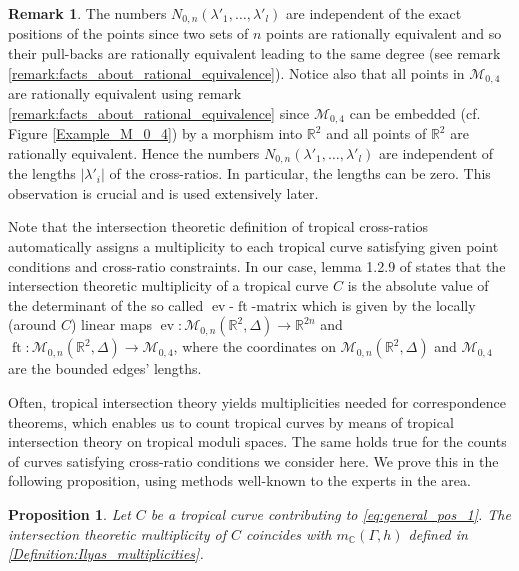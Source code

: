 \documentclass[11pt,reqno,a4]{amsart}
\theoremstyle{dotless}
\newtheorem{proposition}[corollary]{Proposition}
\theoremstyle{definition}
\newtheorem{remark}[corollary]{Remark}
\newcommand{\ft}{\operatorname{ft}}
\newcommand{\ev}{\operatorname{ev}}
\begin{document}
\begin{remark}\label{Remark:N_(0,n)independent of positions/lengths}
The numbers $N_{0,n}\left(\lambda'_1,\dots,\lambda'_l\right)$ are independent of the exact positions of the points since two sets of $n$ points are rationally equivalent and so their pull-backs are rationally equivalent leading to the same degree (see remark \ref{remark:facts_about_rational_equivalence}). Notice also that all points in $\mathcal{M}_{0,4}$ are rationally equivalent using remark \ref{remark:facts_about_rational_equivalence} since $\mathcal{M}_{0,4}$ can be embedded (cf. Figure \ref{Example_M_0_4}) by a morphism into $\mathbb{R}^2$ and all points of $\mathbb{R}^2$ are rationally equivalent. Hence the numbers $N_{0,n}\left(\lambda'_1,\dots,\lambda'_l\right)$ are independent of the lengths $|\lambda'_i|$ of the cross-ratios. In particular, the lengths can be zero. This observation is crucial and is used extensively later.
\end{remark}

Note that the intersection theoretic definition of tropical cross-ratios automatically assigns a multiplicity to each tropical curve satisfying given point conditions and cross-ratio constraints. In our case, lemma 1.2.9 of \cite{Rau} states that the intersection theoretic multiplicity of a tropical curve $C$ is the absolute value of the determinant of the so called $\ev$-$\ft$-matrix which is given by the locally (around $C$) linear maps $\ev:\mathcal{M}_{0,n}\left(\mathbb{R}^2,\Delta \right)\to\mathbb{R}^{2n}$ and $\ft:\mathcal{M}_{0,n}\left(\mathbb{R}^2,\Delta \right)\to\mathcal{M}_{0,4}$, where the coordinates on $\mathcal{M}_{0,n}\left(\mathbb{R}^2,\Delta \right)$ and $\mathcal{M}_{0,4}$ are the bounded edges' lengths.

Often, tropical intersection theory yields multiplicities needed for correspondence theorems, which enables us to count tropical curves by means of tropical intersection theory on tropical moduli spaces. The same holds true for the counts of curves satisfying cross-ratio conditions we consider here. We prove this in the following proposition, using methods well-known to the experts in the area.


\begin{proposition}
Let $C$ be a tropical curve contributing to \eqref{eq:general_pos_1}. The intersection theoretic multiplicity of $C$ coincides with $m_\mathbb{C}(\Gamma,h)$ defined in \ref{Definition:Ilyas_multiplicities}.
\end{proposition}
\end{document}
